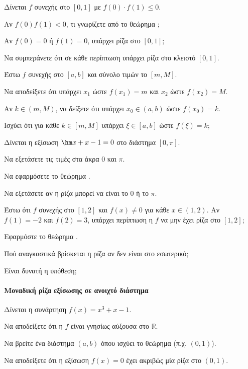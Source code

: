 \documentclass[11pt,a4paper,modern]{FFExercises}
\begin{document}
\askhsh
Δίνεται $f$ συνεχής στο $[0,1]$ με $f(0) \cdot f(1) \le 0$.
\begin{alist}
    \item Αν $f(0)f(1)<0$, τι γνωρίζετε από το θεώρημα ;
    \item Αν $f(0)=0$ ή $f(1)=0$, υπάρχει ρίζα στο $[0,1]$;
    \item Να συμπεράνετε ότι σε κάθε περίπτωση υπάρχει ρίζα στο κλειστό $[0,1]$.
\end{alist}

\askhsh
Έστω $f$ συνεχής στο $[a,b]$ και σύνολο τιμών το $[m, M]$.
\begin{alist}
    \item Να αποδείξετε ότι υπάρχει $x_1$ ώστε $f(x_1)=m$ και $x_2$ ώστε $f(x_2)=M$.
    \item Αν $k \in (m, M)$, να δείξετε ότι υπάρχει $x_0 \in (a,b)$ ώστε $f(x_0)=k$.
    \item Ισχύει ότι για κάθε $k \in [m, M]$ υπάρχει $\xi \in [a,b]$ ώστε $f(\xi)=k$;
\end{alist}

\askhsh
Δίνεται η εξίσωση $\hm x + x - 1 = 0$ στο διάστημα $[0, \pi]$.
\begin{alist}
    \item Να εξετάσετε τις τιμές στα άκρα 0 και $\pi$.
    \item Να εφαρμόσετε το θεώρημα .
    \item Να εξετάσετε αν η ρίζα μπορεί να είναι το 0 ή το $\pi$.
\end{alist}

\askhsh
Έστω ότι $f$ συνεχής στο $[1, 2]$ και $f(x) \ne 0$ για κάθε $x \in (1,2)$. Αν $f(1)=-2$ και $f(2)=3$, υπάρχει περίπτωση η $f$ να μην έχει ρίζα στο $[1,2]$;
\begin{alist}
    \item Εφαρμόστε το θεώρημα .
    \item Πού αναγκαστικά βρίσκεται η ρίζα αν δεν είναι στο εσωτερικό;
    \item Είναι δυνατή η υπόθεση;
\end{alist}
\paragraph{Μοναδική ρίζα εξίσωσης σε ανοιχτό διάστημα}
\askhsh
Δίνεται η συνάρτηση $f(x)=x^3+x-1$.
\begin{alist}
    \item Να αποδείξετε ότι η $f$ είναι γνησίως αύξουσα στο $\mathbb{R}$.
    \item Να βρείτε ένα διάστημα $(a,b)$ όπου ισχύει το θεώρημα  (π.χ. $(0,1)$).
    \item Να αποδείξετε ότι η εξίσωση $f(x)=0$ έχει ακριβώς μία ρίζα στο $(0,1)$.
\end{alist}
\end{document}
